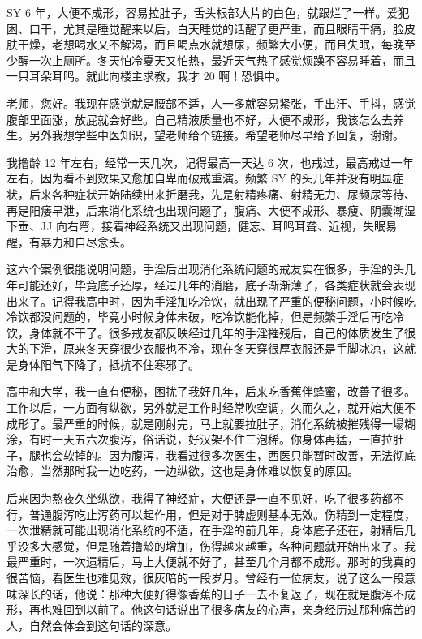 \begin{case}
    SY 6 年，大便不成形，容易拉肚子，舌头根部大片的白色，就跟烂了一样。爱犯困、口干，尤其是睡觉醒来以后，白天睡觉的话醒了更严重，而且眼睛干痛，脸皮肤干燥，老想喝水又不解渴，而且喝点水就想尿，频繁大小便，而且失眠，每晚至少醒一次上厕所。冬天怕冷夏天又怕热，最近天气热了感觉烦躁不容易睡着，而且一只耳朵耳鸣。就此向楼主求教，我才 20 啊！恐惧中。
\end{case}

\begin{case}
    老师，您好。我现在感觉就是腰部不适，人一多就容易紧张，手出汗、手抖，感觉腹部里面涨，放屁就会好些。自己精液质量也不好，大便不成形，我该怎么去养生。另外我想学些中医知识，望老师给个链接。希望老师尽早给予回复，谢谢。
\end{case}

\begin{case}
    我撸龄 12 年左右，经常一天几次，记得最高一天达 6 次，也戒过，最高戒过一年左右，因为看不到效果又愈加自卑而破戒重演。频繁 SY 的头几年并没有明显症状，后来各种症状开始陆续出来折磨我，先是射精疼痛、射精无力、尿频尿等待、再是阳痿早泄，后来消化系统也出现问题了，腹痛、大便不成形、暴瘦、阴囊潮湿下垂、JJ 向右弯，接着神经系统又出现问题，健忘、耳鸣耳聋、近视，失眠易醒，有暴力和自尽念头。
\end{case}

这六个案例很能说明问题，手淫后出现消化系统问题的戒友实在很多，手淫的头几年可能还好，毕竟底子还厚，经过几年的消磨，底子渐渐薄了，各类症状就会表现出来了。记得我高中时，因为手淫加吃冷饮，就出现了严重的便秘问题，小时候吃冷饮都没问题的，毕竟小时候身体未破，吃冷饮能化掉，但是频繁手淫后再吃冷饮，身体就不干了。很多戒友都反映经过几年的手淫摧残后，自己的体质发生了很大的下滑，原来冬天穿很少衣服也不冷，现在冬天穿很厚衣服还是手脚冰凉，这就是身体阳气下降了，抵抗不住寒邪了。

高中和大学，我一直有便秘，困扰了我好几年，后来吃香蕉伴蜂蜜，改善了很多。工作以后，一方面有纵欲，另外就是工作时经常吹空调，久而久之，就开始大便不成形了。最严重的时候，就是刚射完，马上就要拉肚子，消化系统被摧残得一塌糊涂，有时一天五六次腹泻，俗话说，好汉架不住三泡稀。你身体再猛，一直拉肚子，腿也会软掉的。因为腹泻，我看过很多次医生，西医只能暂时改善，无法彻底治愈，当然那时我一边吃药，一边纵欲，这也是身体难以恢复的原因。

后来因为熬夜久坐纵欲，我得了神经症，大便还是一直不见好，吃了很多药都不行，普通腹泻吃止泻药可以起作用，但是对于脾虚则基本无效。伤精到一定程度，一次泄精就可能出现消化系统的不适，在手淫的前几年，身体底子还在，射精后几乎没多大感觉，但是随着撸龄的增加，伤得越来越重，各种问题就开始出来了。我最严重时，一次遗精后，马上大便就不好了，甚至几个月都不成形。那时的我真的很苦恼，看医生也难见效，很灰暗的一段岁月。曾经有一位病友，说了这么一段意味深长的话，他说：那种大便好得像香蕉的日子一去不复返了，现在就是腹泻不成形，再也难回到以前了。他这句话说出了很多病友的心声，亲身经历过那种痛苦的人，自然会体会到这句话的深意。

